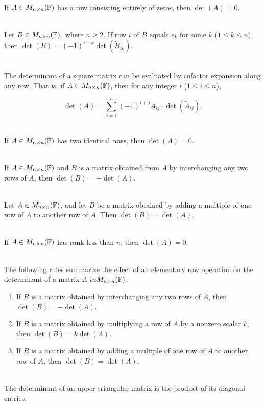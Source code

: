 \begin{corollary}
	\hfill\\
	If $A \in M_{n \times n}(\mathbb{F})$ has a row consisting entirely of zeros, then $\det(A) = 0$.
\end{corollary}

\begin{lemma}
	\hfill\\
	Let $B \in M_{n \times n}(\mathbb{F})$, where $n \geq 2$. If row $i$ of $B$ equals $e_k$ for some $k$ ($1 \leq k \leq n$), then $\det(B) = (-1)^{i+k}\det(\tilde{B}_{ik})$.
\end{lemma}

\begin{theorem}
	\hfill\\
	The determinant of a square matrix can be evaluated by cofactor expansion along any row. That is, if $A \in M_{n \times n}(\mathbb{F})$, then for any integer $i$ ($1 \leq i \leq n$),
	
	\[\det(A) = \sum_{j=1}^{n}(-1)^{i+j}A_{ij}\cdot\det(\tilde{A}_{ij}).\]
\end{theorem}

\begin{corollary}
	\hfill\\
	If $A \in M_{n \times n}(\mathbb{F})$ has two identical rows, then $\det(A) = 0$.
\end{corollary}

\begin{theorem}
	\hfill\\
	If $A \in M_{n \times n}(\mathbb{F})$ and $B$ is a matrix obtained from $A$ by interchanging any two rows of $A$, then $\det(B) = -\det(A)$.
\end{theorem}

\begin{theorem}
	\hfill\\
	Let $A \in M_{n \times n}(\mathbb{F})$, and let $B$ be a matrix obtained by adding a multiple of one row of $A$ to another row of $A$. Then $\det(B) = \det(A)$.
\end{theorem}

\begin{corollary}
	\hfill\\
	If $A \in M_{n \times n}(\mathbb{F})$ has rank less than $n$, then $\det(A) = 0$.
\end{corollary}

\begin{remark}\label{Remark 4.1}
	\hfill\\
	The following rules summarize the effect of an elementary row operation on the determinant of a matrix $A \ in M_{n \times n}(\mathbb{F})$.
	
	\begin{enumerate}
		\item If $B$ is a matrix obtained by interchanging any two rows of $A$, then $\det(B) = -\det(A)$.
		\item If $B$ is a matrix obtained by multiplying a row of $A$ by a nonzero scalar $k$, then $\det(B) = k\det(A)$.
		\item If $B$ is a matrix obtained by adding a multiple of one row of $A$ to another row of $A$, then $\det(B) = \det(A)$.
	\end{enumerate}
\end{remark}

\begin{lemma}
	\hfill\\
	The determinant of an upper triangular matrix is the product of its diagonal entries.
\end{lemma}
